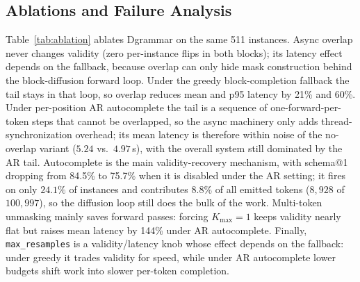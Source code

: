 \documentclass[11pt]{article}
\begin{document}
\subsection{Ablations and Failure Analysis}

Table~\ref{tab:ablation} ablates Dgrammar on the same 511 instances. Async overlap never changes validity (zero per-instance flips in both blocks); its latency effect depends on the fallback, because overlap can only hide mask construction behind the block-diffusion forward loop. Under the greedy block-completion fallback the tail stays in that loop, so overlap reduces mean and p95 latency by 21\% and 60\%. Under per-position AR autocomplete the tail is a sequence of one-forward-per-token steps that cannot be overlapped, so the async machinery only adds thread-synchronization overhead; its mean latency is therefore within noise of the no-overlap variant ($5.24$ vs.\ $4.97$\,s), with the overall system still dominated by the AR tail. Autocomplete is the main validity-recovery mechanism, with schema@1 dropping from 84.5\% to 75.7\% when it is disabled under the AR setting; it fires on only $24.1\%$ of instances and contributes $8.8\%$ of all emitted tokens ($8{,}928$ of $100{,}997$), so the diffusion loop still does the bulk of the work. Multi-token unmasking mainly saves forward passes: forcing $K_{\max}{=}1$ keeps validity nearly flat but raises mean latency by 144\% under AR autocomplete. Finally, \texttt{max\_resamples} is a validity/latency knob whose effect depends on the fallback: under greedy it trades validity for speed, while under AR autocomplete lower budgets shift work into slower per-token completion.
\end{document}
